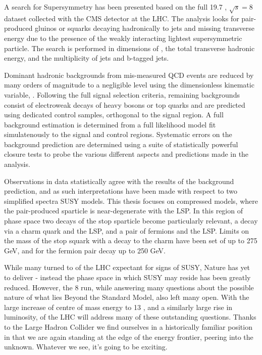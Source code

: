 
A search for Supersymmetry has been presented based on the full 19.7 \fb, 
$\sqrt{s} = 8$ \tev dataset collected with the CMS detector at the LHC. The
analysis looks for pair-produced gluinos or squarks decaying hadronically to
jets and missing transverse energy due to the presence of the weakly interacting
lightest supersymmetric particle. The search is performed in dimensions of \HT,
the total transverse hadronic energy, and the multiplicity of jets and b-tagged
jets.

Dominant hadronic backgrounds from mis-measured QCD events are reduced by many
orders of magnitude to a negligible level using the dimensionless kinematic
variable, \alphat. Following the full signal selection criteria, remaining
backgrounds consist of electroweak decays of
heavy bosons or top quarks and are predicted using dedicated control samples,
orthogonal to the signal region. A full background estimation is determined from
a full likelihood model fit simulatenously to the signal and control regions.
Systematic errors on the background prediction are determined using a suite of
statistically powerful closure tests to probe the various different aspects and
predictions made in the analysis.

Observations in data statistically agree with the results of the background
prediction, and as such interpretations have been made with respect to two
simplified spectra SUSY models. This thesis focuses on compressed models, where
the pair-produced sparticle is near-degenerate with the LSP. In this region of
phase space two decays of the stop sparticle become particularly relevant, a
decay via a charm quark and the LSP, and a pair of fermions and the LSP. Limits
on the mass of the stop squark with a decay to the charm have been set of up to
275 GeV, and for the fermion pair decay up to 250 GeV.

While many turned to \runone of the LHC expectant for signs of SUSY, Nature
has yet to deliver - instead the phase space in which SUSY may
reside has been greatly reduced.
However, the 8 \tev run, while answering many questions about the possible
nature of what lies Beyond the Standard Model, also left many open. With the
large increase of centre of mass energy to 13 \tev, and a similarly large
rise in luminosity, \runtwo of the LHC will address many of these
outstanding questions. Thanks to the Large Hadron Collider we find ourselves in a
historically familiar position in that we are again standing at the edge of the
energy frontier, peering into the unknown. Whatever we see, it's going to be
exciting.
